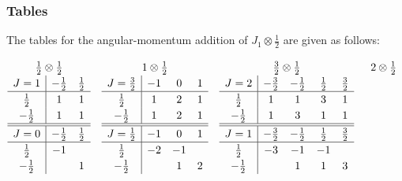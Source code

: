 \documentclass[amsmath,amssymb,prc,aps]{revtex4-2}
\begin{document}
\subsubsection{Tables}

The tables for the angular-momentum addition of $J_1 \otimes \tfrac12$ are given as follows:

\begin{gather}
  \renewcommand{\arraystretch}{1.2}
  \begin{array}[t]{c|cc}
  \multicolumn{3}{c}{\tfrac12\otimes\tfrac12} \\
  J=1        & -\tfrac12 & \tfrac12 \\ \hline
   \tfrac12  &  1        &  1       \\
  -\tfrac12  &  1        &  1
  \\\hline\hline
  J=0        & -\tfrac12 & \tfrac12 \\ \hline
   \tfrac12  & -1        &          \\
  -\tfrac12  &           &  1
  \end{array}
  \quad
  \begin{array}[t]{c|ccc}
  \multicolumn{4}{c}{1\otimes\tfrac12} \\
  J=\tfrac32 & -1 &  0 & 1 \\ \hline
   \tfrac12  &  1 &  2 & 1 \\
  -\tfrac12  &  1 &  2 & 1
  \\\hline\hline
  J=\tfrac12 & -1 &  0 & 1 \\ \hline
   \tfrac12  & -2 & -1 &   \\
  -\tfrac12  &    &  1 & 2
  \end{array}
  \quad
  \begin{array}[t]{c|cccc}
  \multicolumn{5}{c}{\tfrac32\otimes\tfrac12} \\
  J=2        & -\tfrac32 & -\tfrac12 & \tfrac12 & \tfrac32 \\ \hline
   \tfrac12  &  1        &  1        &  3       &  1       \\
  -\tfrac12  &  1        &  3        &  1       &  1
  \\\hline\hline
  J=1        & -\tfrac32 & -\tfrac12 & \tfrac12 & \tfrac32 \\ \hline
   \tfrac12  & -3        & -1        & -1       &          \\
  -\tfrac12  &           &  1        &  1       &  3
  \end{array}
  \quad
  \begin{array}[t]{c|ccccc}
  \multicolumn{6}{c}{2\otimes\tfrac12} \\

\end{array}
\end{gather}
\end{document}
